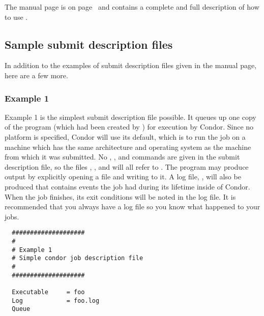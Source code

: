 The  manual page 
is on page~\pageref{man-condor-submit} and
contains a complete and full description of how to use .

\subsection{\label{sec:sample-submit-files}Sample submit description files}  

In addition to the examples of submit description files given
in the 
 manual page, here are a few more.

\subsubsection{Example 1} 

Example 1 is the simplest submit description
file possible. It queues up one copy of the program (which had been
created by ) for execution
by Condor.
Since no platform is specified, Condor will use its default,
which is to run the job on a machine which has the
same architecture and operating system as the machine from which it was
submitted. 
No 
,
, and
commands are given in the submit
description file, so the
files , , and  will all refer to 
.
The program may produce output by explicitly opening a file and writing to
it.
A log file, , will also be produced that contains events
the job had during its lifetime inside of Condor.
When the job finishes, its exit conditions will be noted in the log file.
It is recommended that you always have a log file so you know what
happened to your jobs.
\begin{verbatim}
  ####################                                                    
  # 
  # Example 1                                                            
  # Simple condor job description file                                    
  #                                                                       
  ####################                                                    
                                                                          
  Executable     = foo                                                    
  Log            = foo.log                                                    
  Queue    
\end{verbatim}


